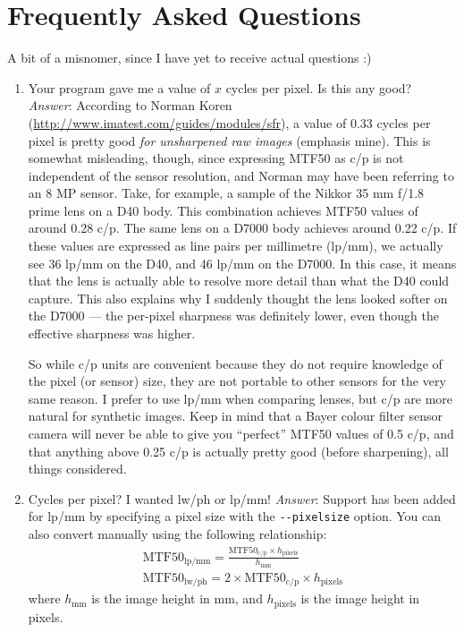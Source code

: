 \documentclass[a4paper]{article}
\begin{document}
\section{Frequently Asked Questions}
A bit of a misnomer, since I have yet to receive actual questions :)
\begin{enumerate}
  \item Your program gave me a value of $x$ cycles per pixel. Is this any
good? \emph{Answer}: According to Norman Koren
(\url{http://www.imatest.com/guides/modules/sfr}), a value of 0.33 cycles
per pixel is pretty good \emph{for unsharpened raw images} (emphasis mine).
This is somewhat misleading, though, since expressing MTF50 as c/p is not
independent of the sensor resolution, and Norman may have been referring to
an 8 MP sensor. Take, for example, a sample of the
Nikkor 35 mm f/1.8 prime lens on a D40 body. This combination achieves MTF50
values of around 0.28 c/p. The same lens on a D7000 body achieves around
0.22 c/p. If these values are expressed as line pairs per millimetre
(lp/mm), we actually see 36 lp/mm on the D40, and 46 lp/mm on the D7000. In
this case, it means that the lens is actually able to resolve more detail
than what the D40 could capture. This also explains why I suddenly thought
the lens looked softer on the D7000 --- the per-pixel sharpness was
definitely lower, even though the effective sharpness was higher.

So while c/p units are convenient because they do not require knowledge of the
pixel (or sensor) size, they are not portable to other sensors for the very
same reason. 
I prefer to use lp/mm when comparing lenses, but c/p are more natural for
synthetic images. Keep in mind that a Bayer colour filter sensor camera
will never be able to give you ``perfect'' MTF50 values of 0.5 c/p, and that
anything above 0.25 c/p is actually pretty good (before sharpening), 
all things considered.
  \item Cycles per pixel? I wanted lw/ph or lp/mm! \emph{Answer}: Support
has been added for lp/mm by specifying a pixel size with the
\verb+--pixelsize+ option.
You can also convert manually using the
following relationship:
    \begin{eqnarray}
	\mathrm{MTF50}_{\mathrm{lp/mm}} = 
	  \frac{\mathrm{MTF50}_{\mathrm{c/p}} \times h_{\mathrm{pixels}}}{h_{\mathrm{mm}}} \\
        \mathrm{MTF50}_{\mathrm{lw/ph}} = 2 \times \mathrm{MTF50}_{\mathrm{c/p}} \times h_{\mathrm{pixels}} 
    \end{eqnarray}
where $h_{\mathrm{mm}}$ is the image height in mm, and $h_{\mathrm{pixels}}$
is the image height in pixels.
\end{enumerate}
\end{document}
